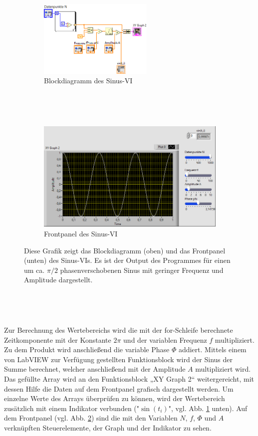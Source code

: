 \begin{figure}[H]
	\centering
	\begin{subfigure}[c]{\textwidth}
		\centering
		\includegraphics[width=0.6\textwidth]{pic/sinBlock.png}
		\caption{Blockdiagramm des Sinus-VI}
		\label{fig:sinusB}
	\end{subfigure}
	
	\
	
	\
	
	\begin{subfigure}[c]{\textwidth}
		\centering
		\includegraphics[width=\textwidth]{pic/sinFront.png}
		\caption{Frontpanel des Sinus-VI}
		\label{fig:sinusF}
	\end{subfigure}
	\caption{Diese Grafik zeigt das Blockdiagramm (oben) und das Frontpanel (unten) des Sinus-VIs. Es ist der Output des Programmes für einen um ca. $\pi / 2$ phasenverschobenen Sinus mit geringer Frequenz und Amplitude dargestellt.}
	\label{fig:sinus}	
\end{figure}

\

\

Zur Berechnung des Wertebereichs wird die mit der for-Schleife berechnete Zeitkomponente mit der Konstante $2 \pi$ und der variablen Frequenz $f$ multipliziert. Zu dem Produkt wird anschließend die variable Phase $\Phi$ addiert. Mittels einem von LabVIEW zur Verfügung gestellten Funktionsblock wird der Sinus der Summe berechnet, welcher anschließend mit der Amplitude $A$ multipliziert wird. Das gefüllte Array wird an den Funktionsblock „XY Graph 2“ weitergereicht, mit dessen Hilfe die Daten auf dem Frontpanel grafisch dargestellt werden. Um einzelne Werte des Arrays überprüfen zu können, wird der Wertebereich zusätzlich mit einem Indikator verbunden ("$\sin(t_i)$", vgl. Abb. \ref{fig:sinusB} unten).
Auf dem Frontpanel (vgl. Abb. \ref{fig:sinusF}) sind die mit den Variablen $N$, $f$, $\Phi$  und $A$ verknüpften Steuerelemente, der Graph und der Indikator zu sehen. 

